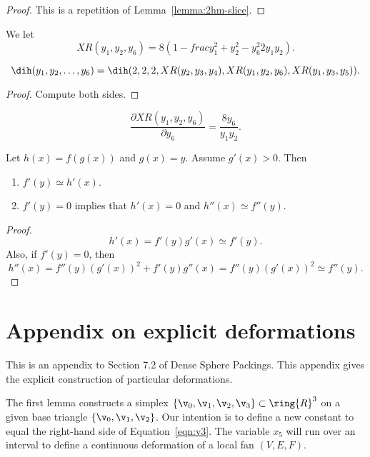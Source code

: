 \begin{proof}  This is a repetition of Lemma~\ref{lemma:2hm-slice}.
\end{proof}

\begin{definition}[$XR$]\guid{}
We let
\[
XR(y_1,y_2,y_6) = 8 (1 - frac{y_1^2 + y_2^2 - y_6^2}{2 y_1 y_2}).
\]
\end{definition}

\begin{lemma}
\[
\dih(y_1,y_2,\ldots,y_6) = \dih(2,2,2,XR(y_2,y_3,y_4),XR(y_1,y_2,y_6),XR(y_1,y_3,y_5)).
\]
\end{lemma}

\begin{proof}
Compute both sides.
\end{proof}

\begin{lemma}
\[
\frac{\partial XR(y_1,y_2,y_6)}{\partial y_6} = \frac{8 y_6}{y_1 y_2}.
\]
\end{lemma}

\begin{lemma}
Let $h(x) = f(g(x))$ and $g(x)= y$.  Assume $g'(x)>0$.  Then
\begin{enumerate}
\item $f'(y) \simeq h'(x)$.
\item $f'(y) = 0$ implies that $h'(x) = 0$ and $h''(x)\simeq f''(y)$.
\end{enumerate}
\end{lemma}

\begin{proof}
\[
h'(x) = f'(y) g'(x) \simeq f'(y).
\]
Also, if $f'(y) = 0$, then
\[
h''(x) = f''(y) (g'(x))^2 + f'(y) g''(x) = f''(y) (g'(x))^2 \simeq f''(y).
\]
\end{proof}

\newpage
\section{Appendix on explicit deformations}\label{sec:sup-deformation}

This is an appendix to Section 7.2 of Dense Sphere Packings.
This appendix gives the explicit construction of particular deformations.

The first lemma constructs a simplex $\{\v_0,\v_1,\v_2,\v_3\}\subset\ring{R}^3$ on
a given base triangle $\{\v_0,\v_1,\v_2\}$.  Our intention is to define a new constant
to equal the right-hand side of Equation~\ref{eqn:v3}.  The variable $x_5$ will run over
an interval to define a continuous deformation of a local fan $(V,E,F)$.


